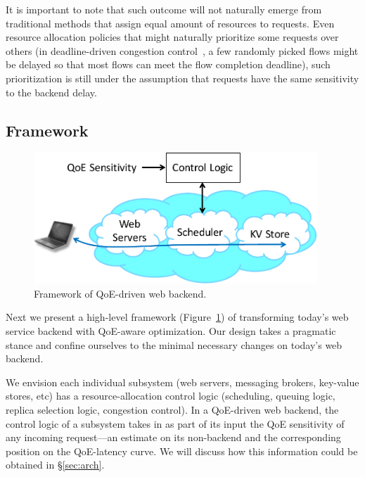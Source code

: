 It is important to note that such outcome will not naturally emerge from traditional methods that assign equal amount of resources to requests.
Even resource allocation policies that might naturally prioritize some requests over others (\eg in deadline-driven congestion control~\cite{??}, a few randomly picked flows might be delayed so that most flows can meet the flow completion deadline), such prioritization is still under the assumption that requests have the same sensitivity to the backend delay.



\subsection{Framework}
\label{subsec:framework}
\begin{figure}
	\centering
	\includegraphics[width=0.95\textwidth]{figs/framework.pdf}
	\caption{Framework of QoE-driven web backend.}
	\label{fig:framework}
\end{figure}
Next we present a high-level framework (Figure~\ref{fig:framework}) of transforming today's web service backend with QoE-aware optimization.
Our design takes a pragmatic stance and confine ourselves to the minimal necessary changes on today's web backend.

We envision each individual subsystem (\eg web servers, messaging brokers, key-value stores, etc) has a resource-allocation control logic (\eg scheduling, queuing logic, replica selection logic, congestion control).
In a QoE-driven web backend, the control logic of a subsystem takes in as part of its input the QoE sensitivity of any incoming request---an estimate on its non-backend and the corresponding position on the QoE-latency curve. 
We will discuss how this information could be obtained in  \S\ref{sec:arch}.

